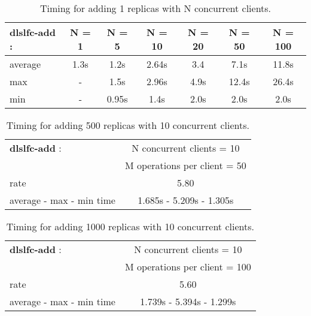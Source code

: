 \documentclass[pdftex]{cmspaper}
\begin{document}
\begin{table}[!htbp]
\begin{center}
 \begin{tabular}{|l|c|c|c|c|c|c|}         \hline
 {\bf dlslfc-add} : & N = 1  & N  = 5  & N = 10 & N = 20 & N = 50 & N = 100 \\ \hline
  average           & 1.3s   & 1.2s    & 2.64s  &  3.4   & 7.1s   & 11.8s \\ \hline
  max               & -      & 1.5s    & 2.96s  &  4.9s  & 12.4s  & 26.4s \\ \hline
  min               &  -     & 0.95s   & 1.4s   &  2.0s  & 2.0s   & 2.0s \\ \hline
\end{tabular}
\caption {Timing for adding 1 replicas with N concurrent clients.}\label{dlslfc-add}
\end{center}
\end{table}


\begin{table}[!htbp]
\begin{center}
 \begin{tabular}{|l|c|}         \hline
   {\bf dlslfc-add} : & N concurrent clients = 10 \\ 
    & M operations per client = 50\\ \hline
    rate             & 5.80 \\ \hline
    average - max - min time  & 1.685s - 5.209s - 1.305s \\ \hline
\end{tabular}
\caption {Timing for adding 500 replicas with 10 concurrent clients.}\label{dlslfc-add}
\end{center}
\end{table}

\begin{table}[!htbp]
\begin{center}
 \begin{tabular}{|l|c|}         \hline
   {\bf dlslfc-add} : & N concurrent clients = 10  \\
   & M operations per client = 100\\ \hline
    rate             & 5.60 \\ \hline
    average - max - min time   & 1.739s - 5.394s - 1.299s \\ \hline
\end{tabular}
\caption {Timing for adding 1000 replicas with 10 concurrent clients.}\label{dlslfc-add}
\end{center}
\end{table}
\end{document}
